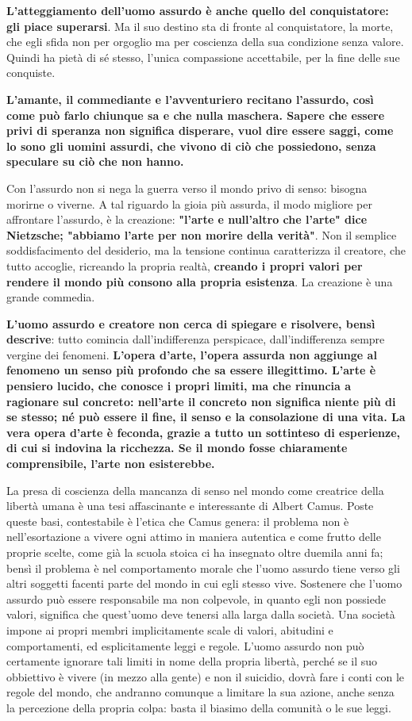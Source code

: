 \documentclass[a4paper,12pt,oneside]{article}%
\begin{document}
\textbf{L'atteggiamento dell'uomo assurdo è anche
quello del conquistatore: gli piace superarsi}. Ma il
suo destino sta di fronte al conquistatore, la morte,
che  egli sfida non per orgoglio ma
per coscienza della sua condizione senza valore.
Quindi ha pietà di sé stesso, l'unica compassione
accettabile, per la fine delle sue conquiste.

\textbf{L'amante, il commediante e l'avventuriero recitano
l'assurdo, così come può farlo chiunque sa
e che nulla maschera. Sapere che essere privi di
speranza non significa disperare, vuol dire essere
saggi, come lo sono gli uomini assurdi, che vivono
di ciò che possiedono, senza speculare su ciò che
non hanno.}

Con l'assurdo non si nega la guerra verso il mondo privo di senso: bisogna morirne o
viverne. A tal riguardo la gioia più assurda, il modo
migliore per affrontare l'assurdo, è la creazione:
\textbf{"l'arte e null'altro che l'arte" dice Nietzsche;
"abbiamo l'arte per non morire della verità"}. Non il
semplice soddisfacimento del desiderio, ma la
tensione continua caratterizza il creatore, che tutto
accoglie, ricreando la propria realtà, \textbf{creando i propri
valori per rendere il mondo più consono alla propria
esistenza}. La creazione è una grande commedia.

\textbf{L'uomo assurdo e creatore non cerca di spiegare e risolvere,
bensì descrive}: tutto comincia dall'indifferenza
perspicace, dall'indifferenza sempre vergine dei
fenomeni. \textbf{L'opera d'arte, l'opera assurda non aggiunge
al fenomeno un senso più profondo che sa essere
illegittimo. L'arte è  pensiero lucido, che conosce i propri
limiti, ma che rinuncia a ragionare sul concreto: nell'arte il concreto non significa niente più di se stesso; né può essere il fine, il senso e la consolazione di una vita. La vera opera d'arte è feconda, grazie a tutto un sottinteso di esperienze, di cui si indovina la ricchezza. Se il mondo fosse chiaramente comprensibile, l'arte non esisterebbe.}
	
La presa di coscienza della mancanza di senso nel mondo come creatrice della libertà umana è una tesi affascinante e interessante di Albert Camus. Poste queste basi, contestabile è l'etica che Camus genera: il problema non è nell'esortazione a vivere ogni attimo in maniera autentica e come frutto delle proprie scelte, come già la scuola stoica ci ha insegnato oltre duemila anni fa; bensì il problema è nel comportamento morale che l'uomo assurdo tiene verso gli altri soggetti facenti parte del mondo in cui egli stesso vive. Sostenere che l'uomo assurdo può essere responsabile ma non colpevole, in quanto egli non possiede valori, significa che quest'uomo deve tenersi alla larga dalla società. Una società impone ai propri membri implicitamente scale di valori, abitudini e comportamenti, ed esplicitamente leggi e regole. L'uomo assurdo non può certamente ignorare tali limiti in nome della propria libertà, perché se il suo obbiettivo è vivere (in mezzo alla gente) e non il suicidio, dovrà fare i conti con le regole del mondo, che andranno comunque a limitare la sua azione, anche senza la percezione della propria colpa: basta il biasimo della comunità o le sue leggi.
\end{document}
